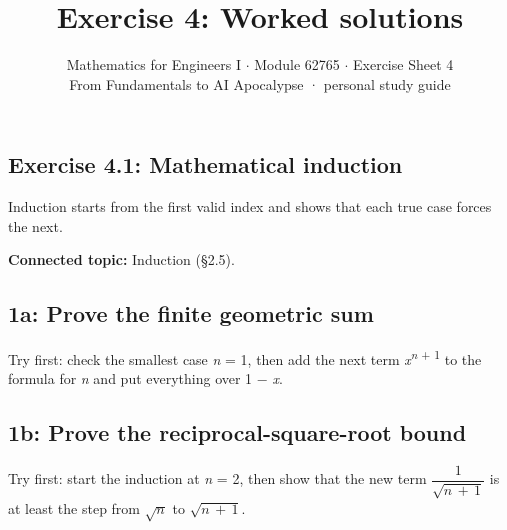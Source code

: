 \documentclass[11pt]{article}
\title{\sffamily\bfseries\color{FAUblue}Exercise 4: Worked solutions}
\author{Mathematics for Engineers I \ensuremath{\cdot} Module 62765 \ensuremath{\cdot} Exercise Sheet 4\\[2pt]\small From Fundamentals to AI Apocalypse · personal study guide}
\date{}
\begin{document}
\maketitle
\begingroup\footnotesize\setlength{\parskip}{0pt}\tableofcontents\endgroup
\clearpage

\begin{keepsection}
\section{Exercise 4.1: Mathematical induction}

Induction starts from the first valid index and shows that each true case forces the next.

\textbf{Connected topic:} Induction (§2.5).

\begin{keepsection}
\subsection{1a: Prove the finite geometric sum}

Try first: check the smallest case \textit{n} = 1, then add the next term \textit{x}\textsuperscript{\textit{n} + 1} to the formula for \textit{n} and put everything over 1 \ensuremath{-} \textit{x}.

\end{keepsection}

\begin{keepsection}
\subsection{1b: Prove the reciprocal-square-root bound}

Try first: start the induction at \textit{n} = 2, then show that the new term {\small\ensuremath{\dfrac{1}{\sqrt{{n}\, +\, 1}}}} is at least the step from \ensuremath{\sqrt{{n}}} to \ensuremath{\sqrt{{n}\, +\, 1}}.

\end{keepsection}
\end{keepsection}
\end{document}
